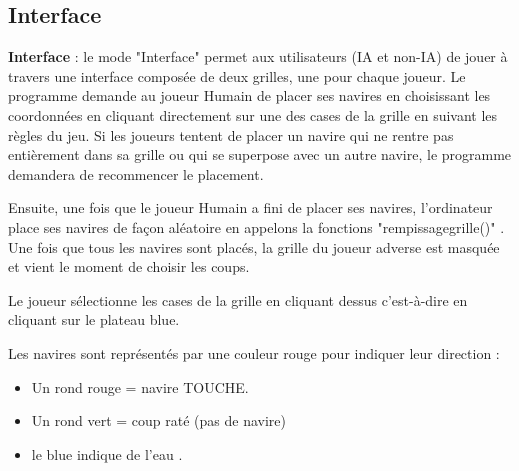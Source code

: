 \documentclass{rapport}
\begin{document}
{\subsection{Interface}
\textbf{Interface} : le mode "Interface" permet aux utilisateurs (IA et non-IA) de jouer à travers une interface composée de deux grilles, une pour chaque joueur. Le programme demande au joueur Humain de placer ses navires en choisissant les coordonnées en cliquant directement sur une des cases de la grille en suivant les règles du jeu. Si les joueurs tentent de placer un navire qui ne rentre pas entièrement dans sa grille ou qui se superpose avec un autre navire, le programme demandera de recommencer le placement.

Ensuite, une fois que le joueur Humain a fini de placer ses navires, l'ordinateur place ses navires de façon aléatoire en appelons la fonctions "rempissagegrille()" . Une fois que tous les navires sont placés, la grille du joueur adverse est masquée et vient le moment de choisir les coups.


Le joueur sélectionne les cases de la grille en cliquant dessus c'est-à-dire en cliquant sur le plateau blue.

Les navires sont représentés par une couleur rouge pour indiquer leur direction :
\begin{itemize}
\item Un rond rouge = navire TOUCHE.
\item Un rond vert = coup raté (pas de navire)
\item le blue indique de l'eau .
\end{itemize}



}
\end{document}

